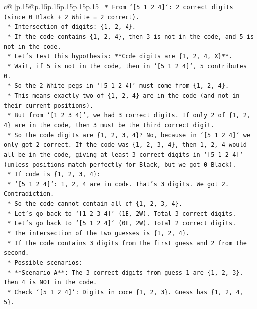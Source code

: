 \documentclass{article}
\begin{document}
{\begin{supertabular}{c@{$\;$}|p{.15\linewidth}@{}p{.15\linewidth}p{.15\linewidth}p{.15\linewidth}p{.15\linewidth}p{.15\linewidth}}
{{{\texttt{    *   From `{[}5 1 2 4{]}`: 2 correct digits (since 0 Black + 2 White = 2 correct).} \\
\texttt{    *   Intersection of digits: \{1, 2, 4\}.} \\
\texttt{    *   If the code contains \{1, 2, 4\}, then 3 is not in the code, and 5 is not in the code.} \\
\texttt{    *   Let's test this hypothesis: **Code digits are \{1, 2, 4, X\}**.} \\
\texttt{    *   Wait, if 5 is not in the code, then in `{[}5 1 2 4{]}`, 5 contributes 0.} \\
\texttt{    *   So the 2 White pegs in `{[}5 1 2 4{]}` must come from \{1, 2, 4\}.} \\
\texttt{    *   This means exactly two of \{1, 2, 4\} are in the code (and not in their current positions).} \\
\texttt{    *   But from `{[}1 2 3 4{]}`, we had 3 correct digits. If only 2 of \{1, 2, 4\} are in the code, then 3 must be the third correct digit.} \\
\texttt{    *   So the code digits are \{1, 2, 3, 4\}? No, because in `{[}5 1 2 4{]}` we only got 2 correct. If the code was \{1, 2, 3, 4\}, then 1, 2, 4 would all be in the code, giving at least 3 correct digits in `{[}5 1 2 4{]}` (unless positions match perfectly for Black, but we got 0 Black).} \\
\texttt{    *   If code is \{1, 2, 3, 4\}:} \\
\texttt{        *   `{[}5 1 2 4{]}`: 1, 2, 4 are in code. That's 3 digits. We got 2. Contradiction.} \\
\texttt{    *   So the code cannot contain all of \{1, 2, 3, 4\}.} \\
\texttt{    *   Let's go back to `{[}1 2 3 4{]}` (1B, 2W). Total 3 correct digits.} \\
\texttt{    *   Let's go back to `{[}5 1 2 4{]}` (0B, 2W). Total 2 correct digits.} \\
\texttt{    *   The intersection of the two guesses is \{1, 2, 4\}.} \\
\texttt{    *   If the code contains 3 digits from the first guess and 2 from the second.} \\
\texttt{    *   Possible scenarios:} \\
\texttt{        *   **Scenario A**: The 3 correct digits from guess 1 are \{1, 2, 3\}. Then 4 is NOT in the code.} \\
\texttt{            *   Check `{[}5 1 2 4{]}`: Digits in code \{1, 2, 3\}. Guess has \{1, 2, 4, 5\}.} \\
}}}
\end{supertabular}}
\end{document}
